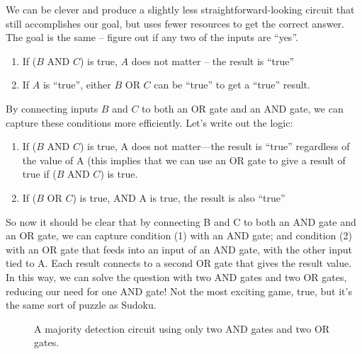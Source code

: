 We can be clever and produce a slightly less straightforward-looking circuit that still accomplishes our goal, but uses fewer resources to get the correct answer. The goal is the same -- figure out if any two of the inputs are ``yes''. 

\begin{enumerate}
\item If ($B$ AND $C$) is true, $A$ does not matter -- the result is ``true''

\item If $A$ is ``true'', either $B$ OR $C$ can be ``true'' to get a ``true'' result.

\end{enumerate}

By connecting inputs $B$ and $C$ to both an OR gate and an AND gate, we can capture these conditions more efficiently. Let's write out the logic:

\begin{enumerate}
\item If ($B$ AND $C$) is true, A does not matter---the result is ``true'' regardless of the value of A (this implies that we can use an OR gate to give a result of true if ($B$ AND $C$) is true.

\item If ($B$ OR $C$) is true, AND A is true, the result is also ``true''
\end{enumerate}

So now it should be clear that by connecting B and C to both an AND gate and an OR gate, we can capture condition (1) with an AND gate; and condition (2) with an OR gate that feeds into an input of an AND gate, with the other input tied to A. 
Each result connects to a second OR gate that gives the result value.
In this way, we can solve the question with two AND gates and two OR gates, reducing our need for one AND gate! 
Not the most exciting game, true, but it's the same sort of puzzle as Sudoku.

\begin{figure}[hb!]
\begin{center}



\caption{A majority detection circuit using only two AND gates and two OR gates.}

\end{center}
\end{figure}
